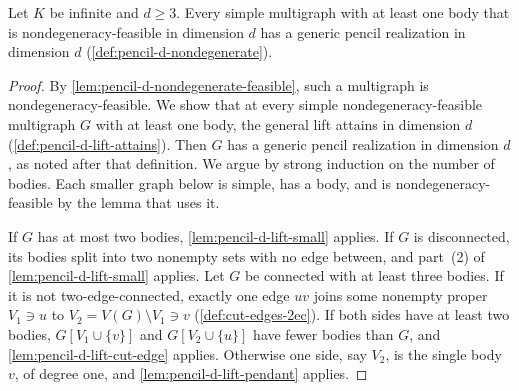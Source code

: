 \begin{theorem}
  \label{thm:pencil-d-generic}
  \leanok
  Let $K$ be infinite and $d \ge 3$. Every simple multigraph with at least
  one body that is nondegeneracy-feasible in dimension $d$ has a generic
  pencil realization in dimension $d$ (\cref{def:pencil-d-nondegenerate}).
\end{theorem}
\begin{proof}
  \leanok
  By \cref{lem:pencil-d-nondegenerate-feasible}, such a multigraph is
  nondegeneracy-feasible. We show that at every simple
  nondegeneracy-feasible multigraph $G$ with at least one body, the general
  lift attains in dimension $d$ (\cref{def:pencil-d-lift-attains}). Then
  $G$ has a generic pencil realization in dimension $d$, as noted after
  that definition. We argue by strong induction on the number of bodies.
  Each smaller graph below is simple, has a body, and is
  nondegeneracy-feasible by the lemma that uses it.

  If $G$ has at most two bodies, \cref{lem:pencil-d-lift-small} applies.
  If $G$ is disconnected, its bodies split into two nonempty sets with no
  edge between, and part~(2) of \cref{lem:pencil-d-lift-small} applies.
  Let $G$ be connected with at least three bodies. If it is not
  two-edge-connected, exactly one edge $uv$ joins some nonempty proper
  $V_1 \ni u$ to $V_2 = V(G) \setminus V_1 \ni v$
  (\cref{def:cut-edges-2ec}). If both sides have at least two bodies,
  $G[V_1 \cup \{v\}]$ and $G[V_2 \cup \{u\}]$ have fewer bodies than $G$,
  and \cref{lem:pencil-d-lift-cut-edge} applies. Otherwise one side, say
  $V_2$, is the single body $v$, of degree one, and
  \cref{lem:pencil-d-lift-pendant} applies.


\end{proof}
